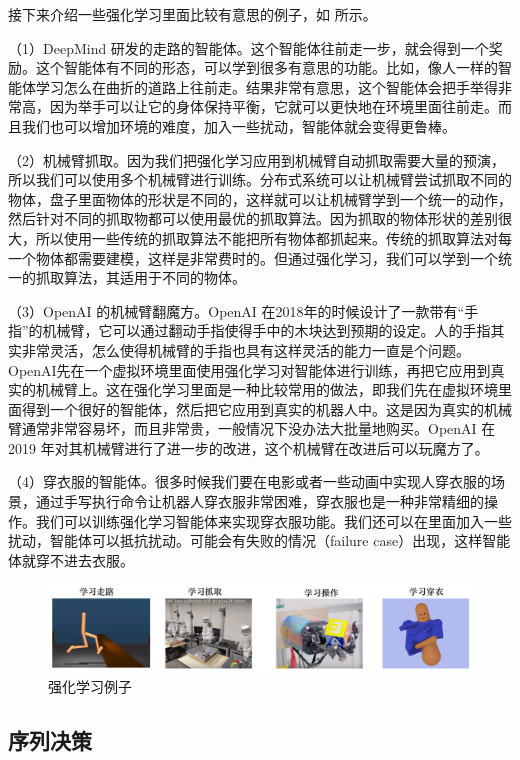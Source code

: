 接下来介绍一些强化学习里面比较有意思的例子，如 所示。

（1）DeepMind 研发的走路的智能体。这个智能体往前走一步，就会得到一个奖励。这个智能体有不同的形态，可以学到很多有意思的功能。比如，像人一样的智能体学习怎么在曲折的道路上往前走。结果非常有意思，这个智能体会把手举得非常高，因为举手可以让它的身体保持平衡，它就可以更快地在环境里面往前走。而且我们也可以增加环境的难度，加入一些扰动，智能体就会变得更鲁棒。

（2）机械臂抓取。因为我们把强化学习应用到机械臂自动抓取需要大量的预演，所以我们可以使用多个机械臂进行训练。分布式系统可以让机械臂尝试抓取不同的物体，盘子里面物体的形状是不同的，这样就可以让机械臂学到一个统一的动作，然后针对不同的抓取物都可以使用最优的抓取算法。因为抓取的物体形状的差别很大，所以使用一些传统的抓取算法不能把所有物体都抓起来。传统的抓取算法对每一个物体都需要建模，这样是非常费时的。但通过强化学习，我们可以学到一个统一的抓取算法，其适用于不同的物体。

（3）OpenAI 的机械臂翻魔方。OpenAI 在2018年的时候设计了一款带有“手指”的机械臂，它可以通过翻动手指使得手中的木块达到预期的设定。人的手指其实非常灵活，怎么使得机械臂的手指也具有这样灵活的能力一直是个问题。OpenAI先在一个虚拟环境里面使用强化学习对智能体进行训练，再把它应用到真实的机械臂上。这在强化学习里面是一种比较常用的做法，即我们先在虚拟环境里面得到一个很好的智能体，然后把它应用到真实的机器人中。这是因为真实的机械臂通常非常容易坏，而且非常贵，一般情况下没办法大批量地购买。OpenAI 在2019 年对其机械臂进行了进一步的改进，这个机械臂在改进后可以玩魔方了。

（4）穿衣服的智能体。很多时候我们要在电影或者一些动画中实现人穿衣服的场景，通过手写执行命令让机器人穿衣服非常困难，穿衣服也是一种非常精细的操作。我们可以训练强化学习智能体来实现穿衣服功能。我们还可以在里面加入一些扰动，智能体可以抵抗扰动。可能会有失败的情况（failure case）出现，这样智能体就穿不进去衣服。

\begin{figure}[htb]
    \centering
    \includegraphics[width=0.7\linewidth]{res/ch1/1.17}
    \caption{强化学习例子}
    \label{fig:fig1.17}
\end{figure}

\subsection{序列决策}

